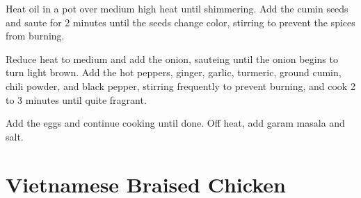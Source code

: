 \documentclass[oneside]{book}  %
\def\thisrecipe{}  %
\newcommand{\recipe}[1]{\section{#1}\def\thisrecipe{: #1}} %
\begin{document}
\begin{directions}
  \item Heat oil in a pot over medium high heat until shimmering. Add the cumin
  seeds and saute for 2 minutes until the seeds change color, stirring to
  prevent the spices from burning.

  \item Reduce heat to medium and add the onion, sauteing until the onion begins
  to turn light brown. Add the hot peppers, ginger, garlic, turmeric, ground
  cumin, chili powder, and black pepper, stirring frequently to prevent burning,
  and cook 2 to 3 minutes until quite fragrant.

  \item Add the eggs and continue cooking until done. Off heat, add garam masala
  and salt.
\end{directions}


\todo[Tomatoes and red cabbage?]
\recipe{Vietnamese Braised Chicken} \label{recipe:vietnamese_braised_chicken} %
\end{document}
